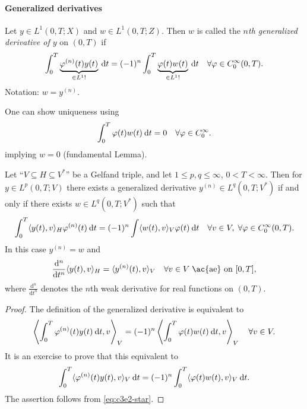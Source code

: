 \documentclass[../skript.tex]{subfiles}
\begin{document}
\paragraph{Generalized derivatives}
\begin{definition} %
\label{def:c3e14}
Let $y \in L^1(0, T; X)$ and $w \in L^1(0, T; Z)$. Then $w$ is called the \emph{$n$th generalized derivative of $y$} on $(0, T)$ if
\[
	\int_0^T \underbrace{\varphi^{(n)}(t) y(t)}_{\in L^1 !} \:\mathrm{d}t = (-1)^n \int_0^T \underbrace{ \varphi(t) w(t) }_{\in L^1 !} \:\mathrm{d}t \quad \forall \varphi \in C_0^\infty(0, T).
\]
Notation: $w = y^{(n)}$.
\end{definition}
One can show uniqueness using
\[
	\int_0^T \varphi(t) w(t) \:\mathrm{d}t = 0 \quad \forall \varphi \in C_0^\infty.
\]
implying $w = 0$ (fundamental Lemma).
\begin{proposition}[Existence] %
Let ``$V \subseteq H \subseteq V^*$'' be a Gelfand triple, and let $1 \leq p, q \leq \infty$, $0 < T < \infty$.
Then for $y \in L^p(0, T; V)$ there exists a generalized derivative $y^{(n)} \in L^q(0, T; V^*)$ if and only if there exists $w \in L^q(0, T; V^*)$ such that
\[
	\int_0^T \langle y(t), v \rangle_H \varphi^{(n)}(t) \:\mathrm{d}t = (-1)^n \int \langle w(t), v \rangle_V \varphi(t) \:\mathrm{d}t \quad \forall v \in V, \; \forall \varphi \in C_0^\infty(0, T).
\]
In this case $y^{(n)} = w$ and
\[
	\frac{\mathrm{d}^n}{\mathrm{d} t^n} \langle y(t), v \rangle_H = \langle y^{(n)}(t), v \rangle_V \quad \forall v \in V \; \text{\ac{ae} on } [0, T],
\]
where $\frac{\mathrm{d}^n}{\mathrm{d} t^n}$ denotes the $n$th weak derivative for real functions on $(0, T)$.
\end{proposition}
\begin{proof}
The definition of the generalized derivative is equivalent to 
\[
	\left\langle \int_0^T \varphi^{(n)}(t) y(t) \:\mathrm{d}t, v \right\rangle_V = (-1)^n \left\langle \int_0^T \varphi(t) w(t) \:\mathrm{d}t, v \right\rangle_V \quad \forall v \in V.
\]
It is an exercise to prove that this equivalent to
\[
	\int_0^T \langle \varphi^{(n)} (t) y(t), v \rangle_V \:\mathrm{d}t = (-1)^n \int_0^T \langle \varphi(t) w(t), v \rangle_V \:\mathrm{d}t.
\]
The assertion follows from \cref{eq:c3e2-star}.
\end{proof}
\pagebreak
\end{document}
